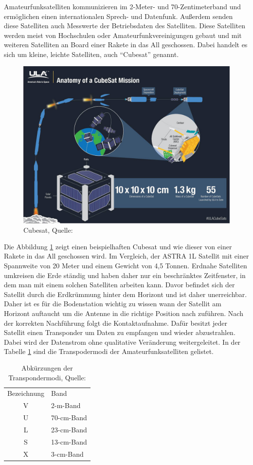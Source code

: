 Amateurfunksatelliten kommunizieren im 2-Meter- und 70-Zentimeterband \cite{Wiki:amateur} und ermöglichen einen 
internationalen Sprech- und Datenfunk. Außerdem senden diese Satelliten
auch Messwerte der Betriebsdaten des Satelliten. Diese Satelliten werden meist von Hochschulen oder Amateurfunkvereinigungen gebaut und mit weiteren 
Satelliten an Board einer Rakete in das All geschossen. Dabei handelt es sich um kleine, leichte Satelliten, auch ``Cubesat'' genannt.

\begin{figure}[h]
 \centering
 \includegraphics[width=0.7\linewidth]{./images/cubesat}
 \caption{Cubesat, Quelle: \cite{cubesat}}
 \label{fig:cubesat}
\end{figure}
Die Abbildung \ref{fig:cubesat} zeigt einen beispielhaften Cubesat und wie dieser von einer Rakete in 
das All geschossen wird. Im Vergleich, der ASTRA 1L Satellit mit 
einer Spannweite von 20 Meter und einem Gewicht von 4,5 Tonnen. Erdnahe Satelliten umkreisen die 
Erde ständig und haben daher nur ein beschränktes 
Zeitfenster, in dem man mit einem solchen Satelliten arbeiten kann. Davor befindet sich der Satellit durch die Erdkrümmung hinter dem Horizont und 
ist daher unerreichbar. Daher ist es für die Bodenstation wichtig zu wissen wann der Satellit am Horizont auftaucht um die Antenne in die richtige 
Position nach zuführen. Nach der korrekten Nachführung folgt die Kontaktaufnahme. Dafür besitzt jeder Satellit einen Transponder um Daten zu 
empfangen und wieder abzustrahlen. Dabei wird der Datenstrom ohne qualitative Veränderung weitergeleitet. In der Tabelle \ref{tab:modi} sind die 
Transpodermodi der Amateurfunksatelliten gelistet. 
\begin{table}[h]
	\centering
	\caption{Abkürzungen der Transpondermodi, Quelle: \cite{amateursat}}
	\begin{tabular}{c|l}
		Bezeichnung & Band\\ 
		V & 2-m-Band 	\\
		U & 70-cm-Band 	\\
		L & 23-cm-Band 	\\
		S & 13-cm-Band 	\\
		X & 3-cm-Band 	\\
	\end{tabular} 
	\label{tab:modi}
\end{table}
